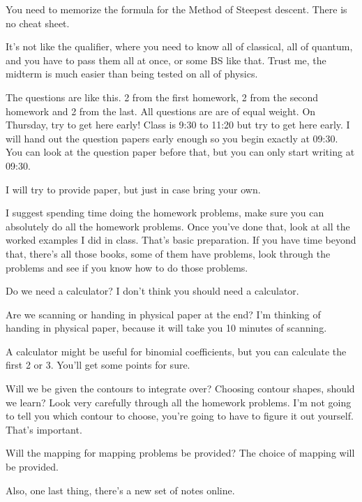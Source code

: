 You need to memorize the formula for the Method of Steepest descent.
There is no cheat sheet.

It's not like the qualifier,
where you need to know
all of classical, all of quantum, and you have to pass them all at once,
or some BS like that.
Trust me, the midterm is much easier than being tested on all of physics.

The questions are like this.
2 from the first homework, 2 from the second homework and 2 from the last.
All questions are are of equal weight.
On Thursday, try to get here early!
Class is 9:30 to 11:20 but try to get here early.
I will hand out the question papers early enough so you begin exactly at 09:30.
You can look at the question paper before that,
but you can only start writing at 09:30.

I will try to provide paper,
but just in case bring your own.

I suggest spending time doing the homework problems,
make sure you can absolutely do all the homework problems.
Once you've done that,
look at all the worked examples I did in class.
That's basic preparation.
If you have time beyond that,
there's all those books,
some of them have problems,
look through the problems and see if you know how to do those problems.

Do we need a calculator?
I don't think you should need a calculator.

Are we scanning or handing in physical paper at the end?
I'm thinking of handing in physical paper,
because it will take you 10 minutes of scanning.

A calculator might be useful for binomial coefficients,
but you can calculate the first 2 or 3.
You'll get some points for sure.

Will we be given the contours to integrate over?
Choosing contour shapes, should we learn?
Look very carefully through all the homework problems.
I'm not going to tell you which contour to choose,
you're going to have to figure it out yourself.
That's important.

Will the mapping for mapping problems be provided?
The choice of mapping will be provided.

Also, one last thing, there's a new set of notes online.
